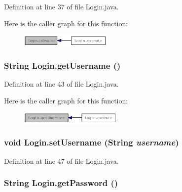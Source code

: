 Definition at line 37 of file Login.java.

Here is the caller graph for this function:\nopagebreak
\begin{figure}[H]
\begin{center}
\leavevmode
\includegraphics[width=127pt]{classLogin_79c55a63f21caff65ec04a20cb9922d0_icgraph}
\end{center}
\end{figure}
\hypertarget{classLogin_e60341bb4848c8cb62211996ab158ca1}{
\subsubsection{\setlength{\rightskip}{0pt plus 5cm}String Login.getUsername ()}}
\label{classLogin_e60341bb4848c8cb62211996ab158ca1}




Definition at line 43 of file Login.java.

Here is the caller graph for this function:\nopagebreak
\begin{figure}[H]
\begin{center}
\leavevmode
\includegraphics[width=142pt]{classLogin_e60341bb4848c8cb62211996ab158ca1_icgraph}
\end{center}
\end{figure}
\hypertarget{classLogin_f74824b6877de3abddc6452bd35113b2}{
\subsubsection{\setlength{\rightskip}{0pt plus 5cm}void Login.setUsername (String {\em username})}}
\label{classLogin_f74824b6877de3abddc6452bd35113b2}




Definition at line 47 of file Login.java.\hypertarget{classLogin_a14a0020dc57ae10a4128bf964958f16}{
\subsubsection{\setlength{\rightskip}{0pt plus 5cm}String Login.getPassword ()}}
\label{classLogin_a14a0020dc57ae10a4128bf964958f16}




